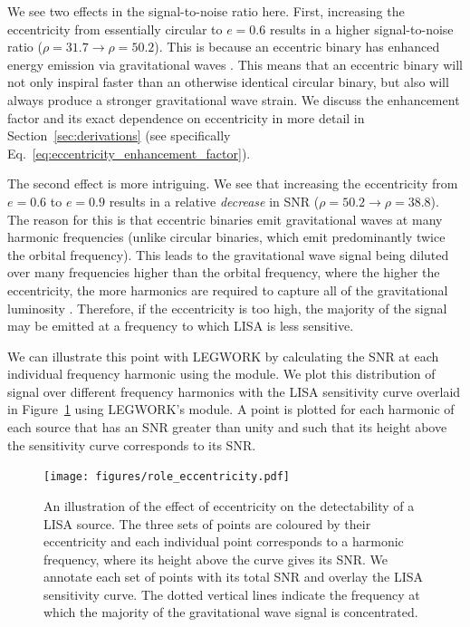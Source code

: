 \documentclass[twocolumn]{aastex631}
\newcommand{\lw}{LEGWORK}
\newcommand{\lwColour}{SeaGreen}
\newcommand{\lwModLink}[1]{\href{https://legwork.readthedocs.io/en/latest/modules.html\#module-legwork.#1}{\color{\lwColour}{\texttt{#1}}}}
\begin{document}
We see two effects in the signal-to-noise ratio here. First, increasing the eccentricity from essentially circular to $e = 0.6$ results in a higher signal-to-noise ratio ($\rho=31.7 \to \rho=50.2$). This is because an eccentric binary has enhanced energy emission via gravitational waves \citep{Peters+1963}. This means that an eccentric binary will not only inspiral faster than an otherwise identical circular binary, but also will always produce a stronger gravitational wave strain. We discuss the enhancement factor and its exact dependence on eccentricity in more detail in Section~\ref{sec:derivations} (see specifically Eq.~\ref{eq:eccentricity_enhancement_factor}).

The second effect is more intriguing. We see that increasing the eccentricity from $e = 0.6$ to $e = 0.9$ results in a relative \textit{decrease} in SNR ($\rho=50.2 \to \rho=38.8$). The reason for this is that eccentric binaries emit gravitational waves at many harmonic frequencies (unlike circular binaries, which emit predominantly twice the orbital frequency). This leads to the gravitational wave signal being diluted over many frequencies higher than the orbital frequency, where the higher the eccentricity, the more harmonics are required to capture all of the gravitational luminosity \citep[see Figure~3 of][]{Peters+1963}. Therefore, if the eccentricity is too high, the majority of the signal may be emitted at a frequency to which LISA is less sensitive.

We can illustrate this point with \lw{} by calculating the SNR at each individual frequency harmonic using the \lwModLink{snr} module. We plot this distribution of signal over different frequency harmonics with the LISA sensitivity curve overlaid in Figure~\ref{fig:role_eccentricity} using \lw{}'s \lwModLink{visualisation} module. A point is plotted for each harmonic of each source that has an SNR greater than unity and such that its height above the sensitivity curve corresponds to its SNR.

\begin{figure}[tb]
    \centering
    \texttt{[image: figures/role\_eccentricity.pdf]}
    \caption{An illustration of the effect of eccentricity on the detectability of a LISA source. The three sets of points are coloured by their eccentricity and each individual point corresponds to a harmonic frequency, where its height above the curve gives its SNR. We annotate each set of points with its total SNR and overlay the LISA sensitivity curve. The dotted vertical lines indicate the frequency at which the majority of the gravitational wave signal is concentrated.}
    \label{fig:role_eccentricity}
\end{figure}
\end{document}
